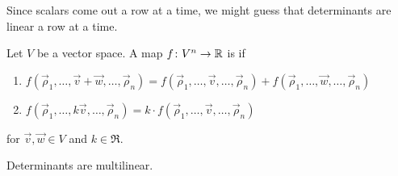 Since scalars come out a row at a time, we might guess that
determinants are linear a row at a time.

\begin{definition} \label{def:multilinear}
Let \( V \) be a vector space.
A map \( \mbox{$f\colon V^n\to \mathbb{R}$} \) is
if  
\begin{enumerate}
  \item 
    $
      f(\vec{\rho}_1,\dots,\vec{v}+\vec{w},
      \ldots,\vec{\rho}_n)
      =f(\vec{\rho}_1,\dots,\vec{v},\dots,\vec{\rho}_n)
      +f(\vec{\rho}_1,\dots,\vec{w},\dots,\vec{\rho}_n)
    $
  \item 
    $
      f(\vec{\rho}_1,\dots,k\vec{v},\dots,\vec{\rho}_n)
      =k\cdot f(\vec{\rho}_1,\dots,\vec{v},\dots,\vec{\rho}_n)
    $
\end{enumerate}
for \( \vec{v}, \vec{w}\in V \) and \( k\in\Re \).
\end{definition}

\begin{lemma}
Determinants are multilinear.
\end{lemma}

